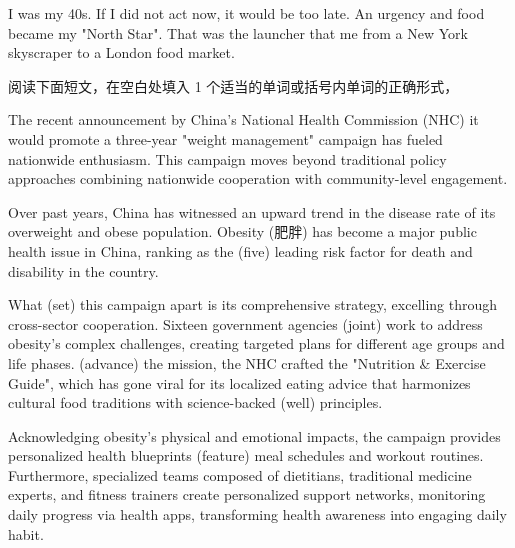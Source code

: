\documentclass{英语试卷}
\begin{document}
\par I was  my 40s. If I did not act now, it would be too late. An urgency  and food became my "North Star". That was the launcher that  me from a New York skyscraper to a London food market.\par
{}
\par 阅读下面短文，在空白处填入 1 个适当的单词或括号内单词的正确形式，\par
\par The recent announcement by China's National Health Commission (NHC)  it would promote a three-year "weight management" campaign has fueled nationwide enthusiasm. This campaign moves beyond traditional policy approaches  combining nationwide cooperation with community-level engagement.\par
\par Over past years, China has witnessed an upward trend in the disease rate of its overweight and obese population. Obesity (肥胖) has become a major public health issue in China, ranking as the \blanknum{} (five) leading risk factor for death and disability in the country.\par
\par What  (set) this campaign apart is its comprehensive strategy, excelling through cross-sector cooperation. Sixteen government agencies  (joint) work to address obesity's complex challenges, creating targeted plans for different age groups and life phases.  (advance) the mission, the NHC crafted the "Nutrition \& Exercise Guide", which has gone viral for its localized eating advice that harmonizes cultural food traditions with science-backed  (well) principles.\par
\par Acknowledging obesity's physical and emotional impacts, the campaign provides personalized health blueprints  (feature) meal schedules and workout routines. Furthermore, specialized teams composed of dietitians, traditional medicine experts, and fitness trainers create personalized support networks, monitoring daily progress via health apps, transforming health awareness into \blanknum{} \blanknum{} engaging daily habit.\par
\end{document}
